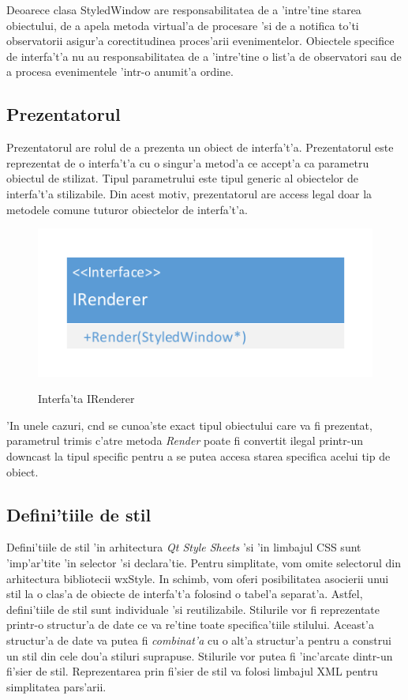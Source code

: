 Deoarece clasa StyledWindow are responsabilitatea de a 'intre'tine starea obiectului, de a apela metoda virtual'a de procesare 'si de a notifica to'ti observatorii asigur'a corectitudinea proces'arii evenimentelor. Obiectele specifice de interfa't'a nu au responsabilitatea de a 'intre'tine o list'a de observatori sau de a procesa evenimentele 'intr-o anumit'a ordine.



\subsection{Prezentatorul}

Prezentatorul are rolul de a prezenta un obiect de interfa't'a. Prezentatorul este reprezentat de o interfa't'a cu o singur'a metod'a ce accept'a ca parametru obiectul de stilizat. Tipul parametrului este tipul generic al obiectelor de interfa't'a stilizabile. Din acest motiv, prezentatorul are access legal doar la metodele comune tuturor obiectelor de interfa't'a.

\begin{center}
\begin{figure}[h]
    \centering
    \includegraphics{img/irenderer.pdf}
    \label{ch2_arhitectura_bloc}
    \caption{Interfa'ta IRenderer}
\end{figure}
\end{center}

'In unele cazuri, c{\ia}nd se cunoa'ste exact tipul obiectului care va fi prezentat, parametrul trimis c'atre metoda \emph{Render} poate fi convertit ilegal printr-un downcast la tipul specific pentru a se putea accesa starea specifica acelui tip de obiect.

\subsection{Defini'tiile de stil}

Defini'tiile de stil 'in arhitectura \emph{Qt Style Sheets} 'si 'in limbajul CSS sunt 'imp'ar'tite 'in selector 'si declara'tie. Pentru simplitate, vom omite selectorul din arhitectura bibliotecii wxStyle. In schimb, vom oferi posibilitatea asocierii unui stil la o clas'a de obiecte de interfa't'a folosind o tabel'a separat'a. Astfel, defini'tiile de stil sunt individuale 'si reutilizabile. Stilurile vor fi reprezentate printr-o structur'a de date ce va re'tine toate specifica'tiile stilului. Aceast'a structur'a de date va putea fi \emph{combinat'a} cu o alt'a structur'a pentru a construi un stil din cele dou'a stiluri suprapuse. Stilurile vor putea fi 'inc'arcate dintr-un fi'sier de stil. Reprezentarea prin fi'sier de stil va folosi limbajul XML pentru simplitatea pars'arii.

